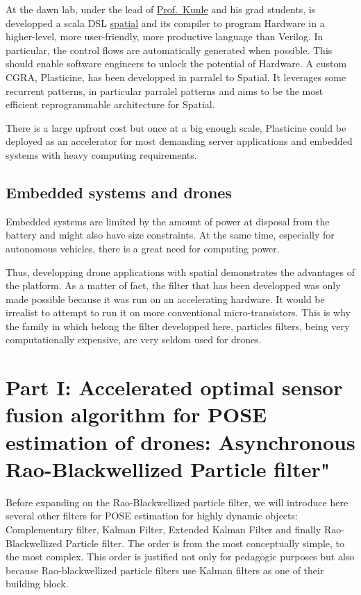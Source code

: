 \documentclass[]{article}
\begin{document}
At the dawn lab, under the lead of
\href{http://arsenalfc.stanford.edu/kunle}{Prof.~Kunle} and his grad
students, is developped a scala DSL
\href{https://github.com/stanford-ppl/spatial-lang}{spatial} and its
compiler to program Hardware in a higher-level, more user-friendly, more
productive language than Verilog. In particular, the control flows are
automatically generated when possible. This should enable software
engineers to unlock the potential of Hardware. A custom CGRA,
Plasticine, has been developped in parralel to Spatial. It leverages
some recurrent patterns, in particular parralel patterns and aims to be
the most efficient reprogrammable architecture for Spatial.

There is a large upfront cost but once at a big enough scale, Plasticine
could be deployed as an accelerator for most demanding server
applications and embedded systems with heavy computing requirements.

\subsection{Embedded systems and
drones}\label{embedded-systems-and-drones}

Embedded systems are limited by the amount of power at disposal from the
battery and might also have size constraints. At the same time,
especially for autonomous vehicles, there is a great need for computing
power.

Thus, developping drone applications with spatial demonstrates the
advantages of the platform. As a matter of fact, the filter that has
been developped was only made possible because it was run on an
accelerating hardware. It would be irrealist to attempt to run it on
more conventional micro-transistors. This is why the family in which
belong the filter developped here, particles filters, being very
computationally expensive, are very seldom used for drones.

\section{Part I: Accelerated optimal sensor fusion algorithm for POSE
estimation of drones: Asynchronous Rao-Blackwellized Particle
filter"}\label{part-i-accelerated-optimal-sensor-fusion-algorithm-for-pose-estimation-of-drones-asynchronous-rao-blackwellized-particle-filter}

Before expanding on the Rao-Blackwellized particle filter, we will
introduce here several other filters for POSE estimation for highly
dynamic objects: Complementary filter, Kalman Filter, Extended Kalman
Filter and finally Rao-Blackwellized Particle filter. The order is from
the most conceptually simple, to the most complex. This order is
justified not only for pedagogic purposes but also because
Rao-blackwellized particle filters use Kalman filters as one of their
building block.
\end{document}
